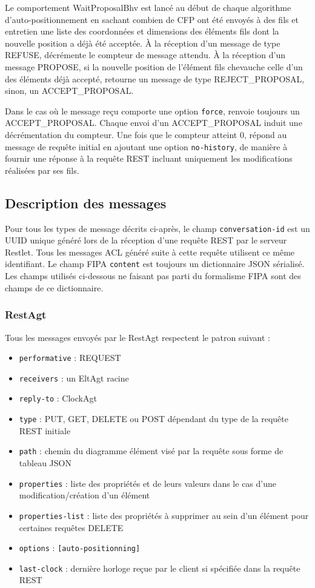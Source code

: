 Le comportement WaitProposalBhv est lancé au début de chaque algorithme d'auto-positionnement en sachant combien de CFP ont été envoyés à des fils et entretien une liste des coordonnées et dimensions des éléments fils dont la nouvelle position a déjà été acceptée.
À la réception d'un message de type REFUSE, décrémente le compteur de message attendu.
À la réception d'un message PROPOSE, si la nouvelle position de l'élément fils chevauche celle d'un des éléments déjà accepté, retourne un message de type REJECT\_PROPOSAL, sinon, un ACCEPT\_PROPOSAL.

Dans le cas où le message reçu comporte une option \lstinline$force$, renvoie toujours un ACCEPT\_PROPOSAL.
Chaque envoi d'un ACCEPT\_PROPOSAL induit une décrémentation du compteur.
Une fois que le compteur atteint 0, répond au message de requête initial en ajoutant une option \lstinline$no-history$, de manière à fournir une réponse à la requête REST incluant uniquement les modifications réalisées par ses fils.

\newpage
\subsection{Description des messages}
Pour tous les types de message décrits ci-après, le champ \lstinline$conversation-id$ est un UUID unique généré lors de la réception d'une requête REST par le serveur Restlet.
Tous les messages ACL généré suite à cette requête utilisent ce même identifiant.
Le champ FIPA \lstinline$content$ est toujours un dictionnaire JSON sérialisé.
Les champs utilisés ci-dessous ne faisant pas parti du formalisme FIPA sont des champs de ce dictionnaire.

\subsubsection{RestAgt}
Tous les messages envoyés par le RestAgt respectent le patron suivant :
\begin{itemize}
	\item \lstinline$performative$ : REQUEST
	\item \lstinline$receivers$ : un EltAgt racine
	\item \lstinline$reply-to$ : ClockAgt
	\item \lstinline$type$ : PUT, GET, DELETE ou POST dépendant du type de la requête REST initiale
	\item \lstinline$path$ : chemin du diagramme élément visé par la requête sous forme de tableau JSON
	\item \lstinline$properties$ : liste des propriétés et de leurs valeurs dans le cas d'une modification/création d'un élément
	\item \lstinline$properties-list$ : liste des propriétés à supprimer au sein d'un élément pour certaines requêtes DELETE
	\item \lstinline$options$ : \lstinline$[auto-positionning]$
	\item \lstinline$last-clock$ : dernière horloge reçue par le client si spécifiée dans la requête REST
\end{itemize}

